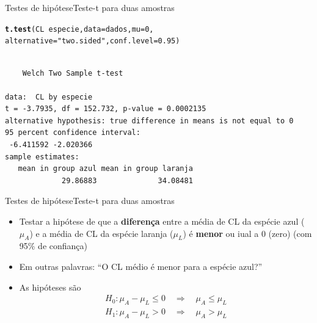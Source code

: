 \documentclass[10pt]{beamer}\usepackage[]{graphicx}\usepackage[]{color}
\makeatletter
\newcommand{\hlnum}[1]{\textcolor[rgb]{0.686,0.059,0.569}{#1}}%
\newcommand{\hlstr}[1]{\textcolor[rgb]{0.192,0.494,0.8}{#1}}%
\newcommand{\hlopt}[1]{\textcolor[rgb]{0,0,0}{#1}}%
\newcommand{\hlstd}[1]{\textcolor[rgb]{0.345,0.345,0.345}{#1}}%
\newcommand{\hlkwc}[1]{\textcolor[rgb]{0.333,0.667,0.333}{#1}}%
\newcommand{\hlkwd}[1]{\textcolor[rgb]{0.737,0.353,0.396}{\textbf{#1}}}%
\newenvironment{kframe}{%
 \def\at@end@of@kframe{}%
 \ifinner\ifhmode%
  \def\at@end@of@kframe{\end{minipage}}%
  \begin{minipage}{\columnwidth}%
 \fi\fi%
 \def\FrameCommand##1{\hskip\@totalleftmargin \hskip-\fboxsep
 \colorbox{shadecolor}{##1}\hskip-\fboxsep
     \hskip-\linewidth \hskip-\@totalleftmargin \hskip\columnwidth}%
 \MakeFramed {\advance\hsize-\width
   \@totalleftmargin\z@ \linewidth\hsize
   \@setminipage}}%
 {\par\unskip\endMakeFramed%
 \at@end@of@kframe}
\newenvironment{knitrout}{}{} %
\theoremstyle{definition}
\makeatother
\begin{document}
\begin{frame}[fragile=singleslide]{Testes de hipótese}{Teste-t para duas amostras}
\begin{knitrout}\small
{}\color{fgcolor}\begin{kframe}
\begin{alltt}
\hlkwd{t.test}\hlstd{(CL} \hlopt{~} \hlstd{especie,} \hlkwc{data} \hlstd{= dados,} \hlkwc{mu} \hlstd{=} \hlnum{0}\hlstd{,}
       \hlkwc{alternative} \hlstd{=} \hlstr{"two.sided"}\hlstd{,} \hlkwc{conf.level} \hlstd{=} \hlnum{0.95}\hlstd{)}
\end{alltt}
\begin{verbatim}

	Welch Two Sample t-test

data:  CL by especie
t = -3.7935, df = 152.732, p-value = 0.0002135
alternative hypothesis: true difference in means is not equal to 0
95 percent confidence interval:
 -6.411592 -2.020366
sample estimates:
   mean in group azul mean in group laranja 
             29.86883              34.08481 
\end{verbatim}
\end{kframe}
\end{knitrout}
\end{frame}

\begin{frame}[fragile=singleslide]{Testes de hipótese}{Teste-t para duas amostras}
  \begin{itemize}
  \item Testar a hipótese de que a \textbf{diferença} entre a média de
    CL da espécie azul ($\mu_A$) e a média de CL da espécie laranja
    ($\mu_L$) é \textbf{menor} ou iual a 0 (zero) (com 95\% de confiança)
  \item Em outras palavras: ``O CL médio é menor para a espécie azul?''
  \item As hipóteses são
    \begin{align*}
      H_0: \mu_A - \mu_L \leq 0 \quad \Rightarrow \quad \mu_A \leq \mu_L \\
      H_1: \mu_A - \mu_L > 0 \quad \Rightarrow \quad \mu_A > \mu_L
    \end{align*}
  \end{itemize}
\end{frame}
\end{document}
